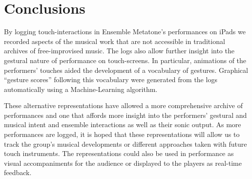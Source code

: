 \documentclass[graybox]{svmult}
\begin{document}
\section{Conclusions}

By logging touch-interactions in Ensemble Metatone's performances on
iPads we recorded aspects of the musical work that are not accessible
in traditional archives of free-improvised music. The logs also allow
further insight into the gestural nature of performance on
touch-screens. In particular, animations of the performers' touches
aided the development of a vocabulary of gestures. Graphical ``gesture
scores'' following this vocabulary were generated from the logs
automatically using a Machine-Learning algorithm.

These alternative representations have allowed a more comprehensive
archive of performances and one that affords more insight into the
performers' gestural and musical intent and ensemble interactions as
well as their sonic output. As more performances are logged, it is
hoped that these representations will allow us to track the group's
musical developments or different approaches taken with future touch
instruments. The representations could also be used in performance as
visual accompaniments for the audience or displayed to the players as
real-time feedback.

%


\end{document}
